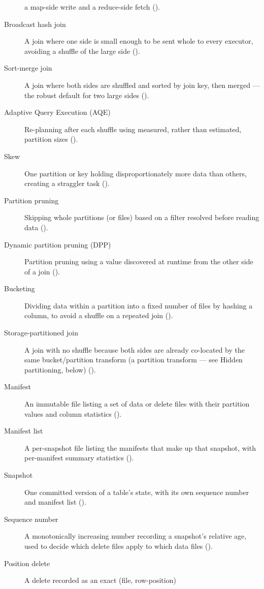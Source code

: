 \begin{description}
      a map-side write and a reduce-side fetch ().
\item[Broadcast hash join] A join where one side is small enough to be sent
      whole to every executor, avoiding a shuffle of the large side
      ().
\item[Sort-merge join] A join where both sides are shuffled and sorted by
      join key, then merged --- the robust default for two large sides
      ().
\item[Adaptive Query Execution (AQE)] Re-planning after each shuffle using
      measured, rather than estimated, partition sizes
      ().
\item[Skew] One partition or key holding disproportionately more data than
      others, creating a straggler task ().
\item[Partition pruning] Skipping whole partitions (or files) based on a
      filter resolved before reading data ().
\item[Dynamic partition pruning (DPP)] Partition pruning using a value
      discovered at runtime from the other side of a join
      ().
\item[Bucketing] Dividing data within a partition into a fixed number of
      files by hashing a column, to avoid a shuffle on a repeated join
      ().
\item[Storage-partitioned join] A join with no shuffle because both sides
      are already co-located by the same bucket/partition transform (a
      partition transform --- see Hidden partitioning, below)
      ().
\item[Manifest] An immutable file listing a set of data or delete files with
      their partition values and column statistics ().
\item[Manifest list] A per-snapshot file listing the manifests that make up
      that snapshot, with per-manifest summary statistics
      ().
\item[Snapshot] One committed version of a table's state, with its own
      sequence number and manifest list ().
\item[Sequence number] A monotonically increasing number recording a
      snapshot's relative age, used to decide which delete files apply to
      which data files ().
\item[Position delete] A delete recorded as an exact (file, row-position)

\end{description}
